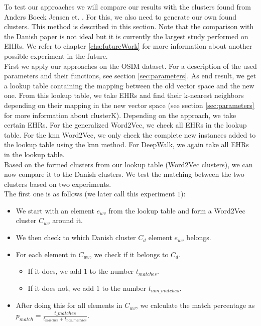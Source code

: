To test our approaches we will compare our results with the clusters found from Anders Boeck Jensen et. \cite{Brunak:article}. For this, we also need to generate our own found clusters. This method is described in this section. Note that the comparison with the Danish paper is not ideal but it is currently the largest study performed on EHRs. We refer to chapter \ref{cha:futureWork} for more information about another possible experiment in the future. \\

First we apply our approaches on the OSIM dataset. For a description of the used parameters and their functions, see section \ref{sec:parameters}. As end result, we get a lookup table containing the mapping between the old vector space and the new one. From this lookup table, we take EHRs and find their k-nearest neighbors depending on their mapping in the new vector space (see section \ref{sec:parameters} for more information about clusterK). Depending on the approach, we take certain EHRs. For the generalized Word2Vec, we check all EHRs in the lookup table. For the knn Word2Vec, we only check the complete new instances added to the lookup table using the knn method. For DeepWalk, we again take all EHRs in the lookup table. \\

Based on the formed clusters from our lookup table (Word2Vec clusters), we can now compare it to the Danish clusters. We test the matching between the two clusters based on two experiments. \\
The first one is as follows (we later call this experiment $1$):

\begin{itemize}

\item We start with an element $e_{wv}$ from the lookup table and form a Word2Vec cluster $C_{wv}$ around it.
\item We then check to which Danish cluster $C_d$ element $e_{wv}$ belongs.
\item For each element in $C_{wv}$, we check if it belongs to $C_d$.
\begin{itemize}
\item If it does, we add $1$ to the number $t_{matches}$.
\item If it does not, we add $1$ to the number $t_{non\_matches}$.
\end{itemize}
\item After doing this for all elements in $C_{wv}$, we calculate the match percentage as $p_{match} = \frac{t\_{matches}}{t_{matches} + t_{non\_matches}}$.

\end{itemize}

